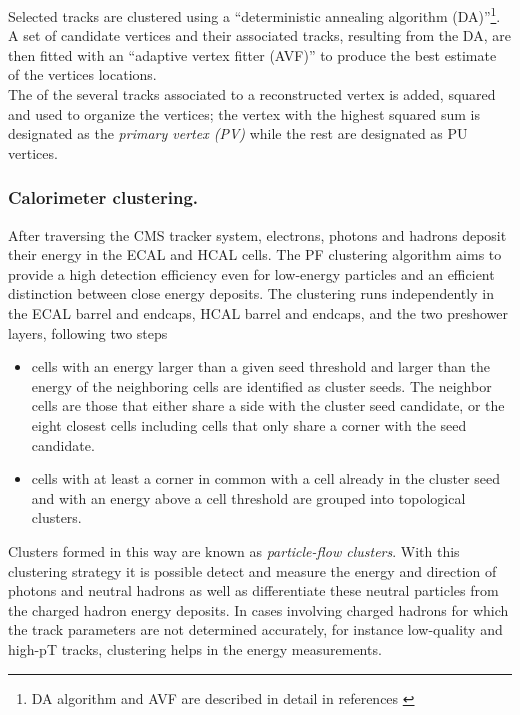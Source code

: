 \noindent Selected tracks are clustered using a ``deterministic annealing algorithm (DA)''\footnote{DA algorithm and AVF are described in detail in references \cite{da, avf}}. A set of candidate vertices and their associated tracks, resulting from the DA, are then fitted with an ``adaptive vertex fitter (AVF)'' to produce the best estimate of the vertices locations.\\

\noindent The \pt of the several tracks associated to a reconstructed vertex is added, squared and used to organize the vertices; the vertex with the highest squared sum is designated as the \textit{primary vertex (PV)} while the rest are designated as PU vertices. 

\subsubsection*{Calorimeter clustering.}

\noindent After traversing the CMS tracker system, electrons, photons and hadrons deposit their energy in the ECAL and HCAL cells. The PF clustering algorithm aims to provide a high detection efficiency even for low-energy particles and an efficient distinction between close energy deposits. The clustering runs independently in the ECAL barrel and endcaps, HCAL barrel and endcaps, and the two preshower layers, following two steps
\begin{itemize}
\item cells with an energy larger than a given seed threshold and larger than the energy of the neighboring cells are identified as cluster seeds. The neighbor cells are those that either share a side with the cluster seed candidate, or the eight closest cells including cells that only share a corner with the seed candidate.
\item cells with at least a corner in common with a cell already in the cluster seed and with an energy above a cell threshold are grouped into topological clusters.
\end{itemize}

\noindent Clusters formed in this way are known as \textit{particle-flow clusters}. With this clustering strategy it is possible detect and measure the energy and direction of photons and neutral hadrons as well as differentiate these neutral particles from the charged hadron energy deposits. In cases involving charged hadrons for which the track parameters are not determined accurately, for instance low-quality and high-pT tracks, clustering helps in the energy measurements. 

